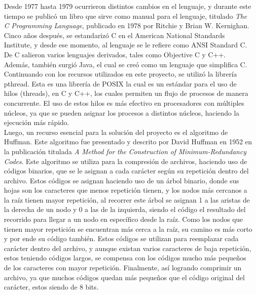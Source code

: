 \documentclass[12pt, article, natbib]{IEEEtran}
\begin{document}
Desde 1977 hasta 1979 ocurrieron distintos cambios en el lenguaje, y durante este tiempo se publicó un libro que sirve como manual para el lenguaje, titulado \textit{The C Programming Language}, publicado en 1978 por Ritchie y Brian W. Kernighan. Cinco años después, se estandarizó C en el American National Standards Institute, y desde ese momento, al lenguaje se le refiere como ANSI Standard C. De C salieron varios lenguajes derivados, tales como Objective C y C++. Además, también surgió Java, el cual se creó como un lenguaje que simplifica C.\cite{mritchie_1993_the}\\

Continuando con los recursos utilizados en este proyecto, se utilizó la librería pthread. Esta es una librería de POSIX la cual es un estándar para el uso de hilos (threads), en C y C++, los cuales permiten un flujo de procesos de manera concurrente. El uso de estos hilos es más efectivo en procesadores con múltiples núcleos, ya que se pueden asignar los procesos a distintos núcleos, haciendo la ejecución más rápido.\cite{ippolito_2020_linux}\\

Luego, un recurso esencial para la solución del proyecto es el algoritmo de Huffman. Este algoritmo fue presentado y descrito por David Huffman en 1952 en la publicación titulada \textit{A Method for the Construction of Minimum-Redundancy Codes}. Este algoritmo se utiliza para la compresión de archivos, haciendo uso de códigos binarios, que se le asignan a cada carácter según su repetición dentro del archivo. Estos códigos se asignan haciendo uso de un árbol binario, donde sus hojas son los caracteres que menos repetición tienen, y los nodos más cercanos a la raíz tienen mayor repetición, al recorrer este árbol se asignan 1 a las aristas de la derecha de un nodo y 0 a las de la izquierda, siendo el código el resultado del recorrido para llegar a un nodo en específico desde la raíz. Como los nodos que tienen mayor repetición se encuentran más cerca a la raíz, su camino es más corto y por ende su código también. Estos códigos se utilizan para reemplazar cada carácter dentro del archivo, y aunque existan varios caracteres de baja repetición, estos teniendo códigos largos, se compensa con los códigos mucho más pequeños de los caracteres con mayor repetición. Finalmente, así logrando comprimir un archivo, ya que muchos códigos quedan más pequeños que el código original del carácter, estos siendo de 8 bits.\cite{lpezfernndez_2010_algoritmo}\cite{techiedelight_2017_algoritmo}\\
\end{document}
